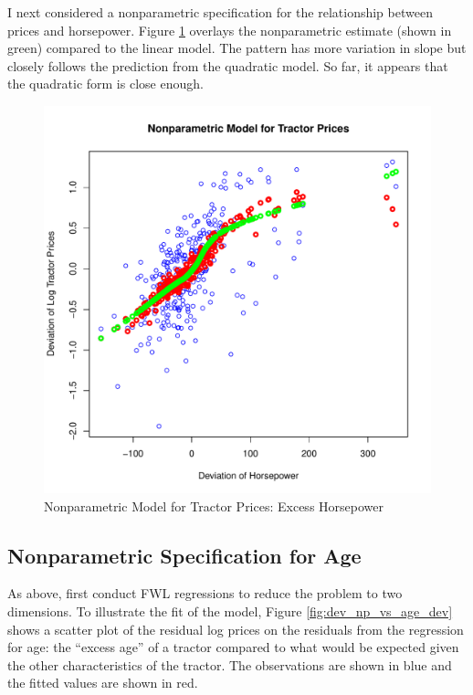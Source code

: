 \documentclass[11pt]{paper}
\begin{document}
I next considered a nonparametric specification for 
the relationship between prices and horsepower.
Figure \ref{fig:dev_np_vs_horse_dev} 
overlays the nonparametric estimate (shown in green) 
compared to the linear model.
The pattern has more variation in slope but 
closely follows the prediction from the quadratic model. 
So far, it appears that the quadratic form
is close enough.

\begin{figure}[h!]
  \centering
  \includegraphics[scale = 0.5, keepaspectratio=true]{../Figures/dev_np_vs_horse_dev}
  \caption{Nonparametric Model for Tractor Prices: Excess Horsepower} \label{fig:dev_np_vs_horse_dev}
\end{figure}

 


\clearpage
\subsection{Nonparametric Specification for Age}

As above, first conduct FWL regressions 
to reduce the problem to two dimensions. 
% 
To illustrate the fit of the model, 
Figure \ref{fig:dev_np_vs_age_dev} 
shows a scatter plot 
of the residual log prices on 
the residuals from the regression for age:
the ``excess age'' of a tractor compared to what would be 
expected given the other characteristics of the tractor. 
% 
The observations are shown in blue
and the fitted values are shown in red.
\end{document}
